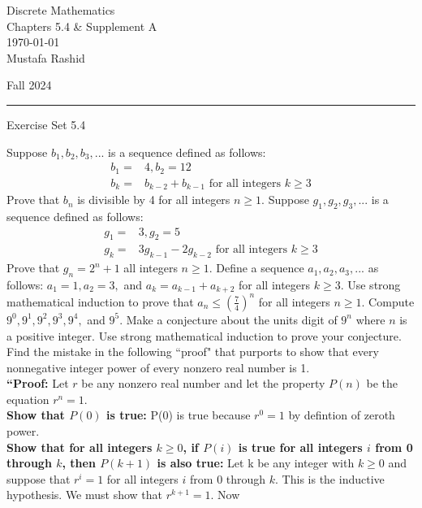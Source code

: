 \documentclass[12pt,letterpaper, onecolumn]{exam}
\begin{document}
	
	\begingroup  
	\noindent\LARGE Discrete Mathematics\\
	\noindent\LARGE Chapters 5.4 \& Supplement A\\
	\noindent\large \today\\
	\noindent\large Mustafa Rashid\par
	\noindent\large Fall 2024\par
	\endgroup
	\rule{\textwidth}{0.4pt}
	\pointsdroppedatright
	\printanswers
	\renewcommand{\solutiontitle}{\noindent\textbf{Ans:}\enspace}  
	
	\centering\large Exercise Set 5.4\\
	\begin{questions}
			\setcounter{question}{1} \question  Suppose $b_1,b_2,b_3,...$ is a sequence defined as follows:
			\begin{align*} 
				b_1=&4, b_2=12\\
				b_k=&b_{k-2}+b_{k-1}\textrm{  for all integers } k\geq3
			\end{align*}
			Prove that $b_n$ is divisible by 4 for all integers $n\geq1.$
		\setcounter{question}{6} \question  Suppose $g_1,g_2,g_3,...$ is a sequence defined as follows:
		\begin{align*} 
			g_1=&3, g_2=5\\
			g_k=&3g_{k-1}-2g_{k-2}\textrm{  for all integers } k\geq3
		\end{align*}
					Prove that $g_n=2^n+1$ all integers $n\geq1.$
		\setcounter{question}{8} \question Define a sequence $a_1,a_2,a_3,...$ as follows: $a_1=1,a_2=3,$ and $a_k=a_{k-1}+a_{k+2}$ for all integers $k\geq3$. Use strong mathematical induction to prove that $a_n \leq \left(\frac{7}{4}\right)^n$ for all integers $n\geq1.$
		\setcounter{question}{17} \question Compute $9^0,9^1,9^2,9^3,9^4,$ and $9^5$. Make a conjecture about the units digit of $9^n$ where $n$ is a positive integer. Use strong mathematical induction to prove your conjecture.
		\question Find the mistake in the following ``proof" that purports to show that every nonnegative integer power of every nonzero real number is 1.\\
		\textbf{``Proof:} Let $r$ be any nonzero real number and let the property $P(n)$ be the equation $r^n=1.$\\
		\textbf{Show that $P(0)$ is true:} P(0) is true because $r^0=1$ by defintion of zeroth power.\\
		\textbf{Show that for all integers $k\geq0$, if $P(i)$ is true for all integers $i$ from 0 through $k$, then $P(k+1)$ is also true:} Let k be any integer with $k\geq0$ and suppose that $r^i=1$ for all integers $i$ from 0 through $k$. This is the inductive hypothesis. We must show that $r^{k+1}=1.$ Now\\

\end{questions}
\end{document}
